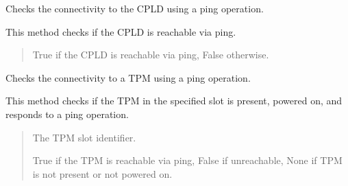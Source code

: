 \documentclass[letterpaper,10pt,english]{sphinxmanual}
\begin{document}
\begin{fulllineitems}

\begin{fulllineitems}
\label{\detokenize{apidocs:subrack_management_board.SubrackMngBoard.GetPingCpld}}
\pysigstartsignatures
{}
\pysigstopsignatures
\sphinxAtStartPar
Checks the connectivity to the CPLD using a ping operation.

\sphinxAtStartPar
This method checks if the CPLD is reachable via ping.
\begin{quote}\begin{description}
\sphinxAtStartPar
True if the CPLD is reachable via ping, False otherwise.

\end{description}\end{quote}

\end{fulllineitems}


\begin{fulllineitems}
\label{\detokenize{apidocs:subrack_management_board.SubrackMngBoard.GetPingTPM}}
\pysigstartsignatures
{}
\pysigstopsignatures
\sphinxAtStartPar
Checks the connectivity to a TPM using a ping operation.

\sphinxAtStartPar
This method checks if the TPM in the specified slot is present, powered on,
and responds to a ping operation.
\begin{quote}\begin{description}
\sphinxAtStartPar
{} \textendash{} The TPM slot identifier.

\sphinxAtStartPar
True if the TPM is reachable via ping, False if unreachable,
None if TPM is not present or not powered on.

\end{description}\end{quote}

\end{fulllineitems}


\end{fulllineitems}
\end{document}
